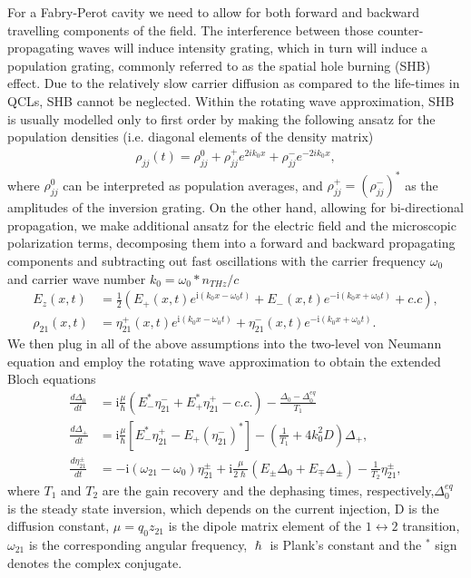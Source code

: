 \documentclass[preprint,secnumarabic,amssymb, nobibnotes, aip, prd]{revtex4-1}
\begin{document}
For a Fabry-Perot cavity we need to allow for both forward and backward travelling components of the field. The interference between those counter-propagating waves will induce intensity grating, which in turn will induce a population grating, commonly referred to as the spatial hole burning (SHB) effect. Due to the relatively slow carrier diffusion as compared to the life-times in QCLs, SHB cannot be neglected. Within the rotating wave approximation, SHB is usually modelled only to first order by making the following ansatz for the population densities (i.e. diagonal elements of the density matrix)
\begin{align}
\rho_{jj}(t) = \rho_{jj}^{0} + \rho_{jj}^{+}e^{2ik_0x}+\rho_{jj}^{-}e^{-2ik_0x}, 
\end{align}
where $\rho_{jj}^{0}$ can be interpreted as population averages, and $\rho_{jj}^{+}=(\rho_{jj}^{-})^{\ast}$ as the amplitudes of the inversion grating. On the other hand, allowing for bi-directional propagation, we make additional ansatz for the electric field and the microscopic polarization terms, decomposing them into a forward and  backward propagating components and subtracting out fast oscillations with the carrier frequency $\omega_0$ and carrier wave number $k_0 = \omega_0*n_{THz}/c$
\begin{align}
E_{z}(x,t) &=\frac{1}{2}\left( E_{+}(x,t)e^{\mathrm{i}(k_{0}x-\omega_{0}t)} +E_{-}(x,t)e^{-\mathrm{i}(k_{0}x+\omega_{0}t)}  +c.c\right)  , \label{eq:e-ansatz} \\
\rho_{21}(x,t)  &  =\eta_{21}^{+}(x,t)e^{  \mathrm{i}(k_{0}x-\omega_{0}t)}  +\eta_{21}^{-}(x,t)e^{-\mathrm{i}(k_{0}x+\omega_{0}t)} .\label{eq:21ansatz}
\end{align}
We then plug in all of the above assumptions into the two-level von Neumann equation and employ the rotating wave approximation to obtain the extended Bloch equations 
\begin{align}
\frac{d\Delta_{0}}{dt} &= \mathrm{i}\frac{\mu}{\hslash}\left(  E_{-}^{\ast}\eta_{21}^{-}+E_{+}^{\ast}\eta_{21}^{+}-c.c.\right) -\frac{\Delta_{0}-\Delta_{0}^{eq}}{T_1} \label{eq:inversion}\\
\frac{d\Delta_{+}}{dt} &= \mathrm{i}\frac{\mu}{\hslash}\left[  E_{-}^{\ast}\eta_{21}^{+}-E_{+}(\eta_{21}^{-})^{\ast}\right] - \left( \frac{1}{T_1}+4k_{0}^{2}D\right)  \Delta_{+},\label{eq:invgrating}\\
\frac{d\eta_{21}^{\pm}}{dt} & = -\mathrm{i}\left(  \omega_{21}-\omega_{0}\right) \eta_{21}^{\pm}+\mathrm{i}\frac{\mu}{2\hslash}\left (  E_{\pm}\Delta_{0}+E_{\mp}\Delta_{\pm}\right)-\frac{1}{T_2}\eta_{21}^{\pm}, \label{eq:coherences}
\end{align}
where $T_1$ and $T_2$ are the gain recovery and the dephasing times, respectively,$\Delta_0^{eq}$ is the steady state inversion, which depends on the current injection, D is the diffusion constant, $\mu = q_0z_{21}$ is the dipole matrix element of the $1\leftrightarrow 2$ transition, $\omega_{21}$ is the corresponding angular frequency, $\hslash$ is Plank's constant and the $^{\ast}$ sign denotes the complex conjugate.
\end{document}
